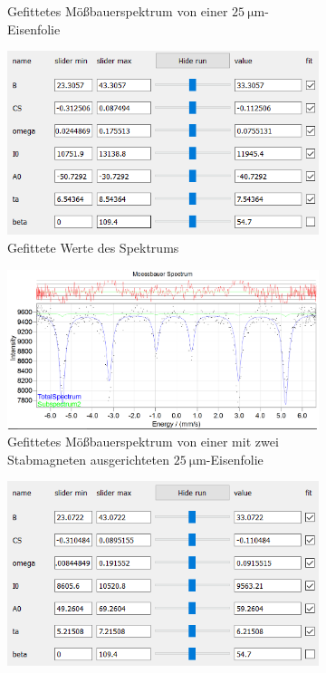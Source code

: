 \documentclass[german, %
parskip=full, %
bibliography=totoc, %
]{scrartcl}
\begin{document}
\begin{figure}[ht]
\begin{subfigure}[b]{0.5\textwidth}
	  \caption{Gefittetes Mößbauerspektrum von einer \(\SI{25}{\micro\meter}\)-Eisenfolie}
	  \label{fig:moess25ta}
  \end{subfigure}
  \begin{subfigure}[b]{0.4\textwidth}
	  \includegraphics[width=\textwidth]{WerteEisen25mitTA}
	  \caption{Gefittete Werte des Spektrums}
	  \label{fig:werte25ta}
  \end{subfigure}
	\begin{subfigure}[b]{0.5\textwidth}
		\includegraphics[width=\textwidth]{MoessbauerEisen25MagnetGerademitTA}
	  \caption{Gefittetes Mößbauerspektrum von einer mit zwei Stabmagneten ausgerichteten \(\SI{25}{\micro\meter}\)-Eisenfolie}
	  \label{fig:moess25geradeta}
  \end{subfigure}
  \begin{subfigure}[b]{0.4\textwidth}
	  \includegraphics[width=\textwidth]{WerteEisen25MagnetGerademitTA}

\end{subfigure}
\end{figure}
\end{document}
